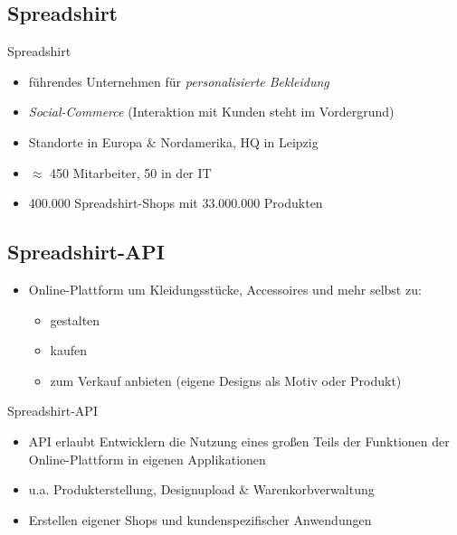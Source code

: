 \subsection{Spreadshirt}
\begin{frame}{Spreadshirt}
    \begin{itemize}
        \item führendes Unternehmen für \emph{personalisierte Bekleidung}
        \item \emph{Social-Commerce} (Interaktion mit Kunden steht im Vordergrund) %
        \item Standorte in Europa \& Nordamerika, HQ in Leipzig
        \item $\approx$ 450 Mitarbeiter, 50 in der IT
        \item 400.000 Spreadshirt-Shops mit 33.000.000 Produkten
    \end{itemize}
\end{frame}

\subsection{Spreadshirt-API}
\begin{frame}[squeeze]
    \begin{itemize}
        \item Online-Plattform um Kleidungsstücke, Accessoires und mehr selbst zu:
        \begin{itemize}
            \item gestalten
            \item kaufen
            \item zum Verkauf anbieten (eigene Designs als Motiv oder Produkt)
        \end{itemize}
    \end{itemize}

    \begin{block}{Spreadshirt-API}
        \begin{itemize}
            \item API erlaubt Entwicklern die Nutzung eines großen Teils der Funktionen der Online-Plattform in eigenen Applikationen
            \item u.a. Produkterstellung, Designupload \& Warenkorbverwaltung
            \item Erstellen eigener Shops und kundenspezifischer Anwendungen %
        \end{itemize}
    \end{block}
\end{frame}

